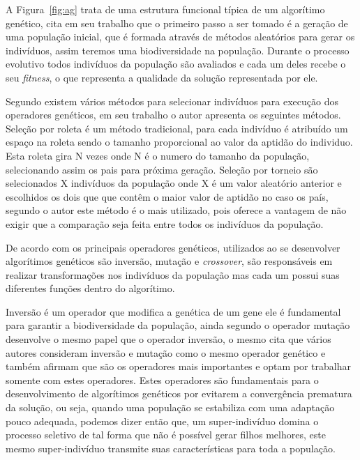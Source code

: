 
A Figura~\ref{fig:ag} trata de uma estrutura funcional típica de um algorítimo genético, \cite{de1999introduccao} cita em seu trabalho que o primeiro passo a ser tomado é a geração de uma população inicial, que é formada através de métodos aleatórios para gerar os indivíduos, assim teremos uma biodiversidade na população. Durante o processo evolutivo todos indivíduos da população são avaliados e cada um deles recebe o seu \textit{fitness}, o que representa a qualidade da solução representada por ele.\par


Segundo \cite{lobo2005soluccao} existem vários métodos para selecionar indivíduos para execução dos operadores genéticos, em seu trabalho o autor apresenta os seguintes métodos. Seleção por roleta é um método tradicional, para cada indivíduo é atribuído um espaço na roleta sendo o tamanho proporcional ao valor da aptidão do individuo. Esta roleta gira N vezes onde N é o numero do tamanho da população, selecionando assim os pais para próxima geração. Seleção por torneio são selecionados X indivíduos da população onde X é um valor aleatório anterior e escolhidos os dois que que contêm o maior valor de aptidão no caso os país, segundo o autor este método é o mais utilizado, pois oferece a vantagem de não exigir que a comparação seja feita entre todos os indivíduos da população.\par


De acordo com \cite{goes2005otimizaccao} os principais operadores genéticos, utilizados ao se desenvolver algorítimos genéticos são inversão, mutação e \textit{crossover}, são responsáveis em realizar transformações nos indivíduos da população mas cada um possui suas diferentes funções dentro do algorítimo.\par
Inversão é um operador que modifica a genética de um gene ele é fundamental para garantir a biodiversidade da população, ainda segundo \cite{goes2005otimizaccao} o operador mutação  desenvolve o mesmo papel que o operador inversão, o mesmo cita que vários autores consideram inversão e mutação como o mesmo operador genético e também afirmam que são os operadores mais importantes e optam por trabalhar somente com estes operadores. Estes operadores são fundamentais para o desenvolvimento de algorítimos genéticos por evitarem a convergência prematura da solução, ou seja, quando uma população se estabiliza com uma adaptação pouco adequada, podemos dizer então que, um super-indivíduo domina o processo seletivo de tal forma que não é possível gerar filhos melhores, este mesmo super-indivíduo transmite suas características para toda a população.\par

